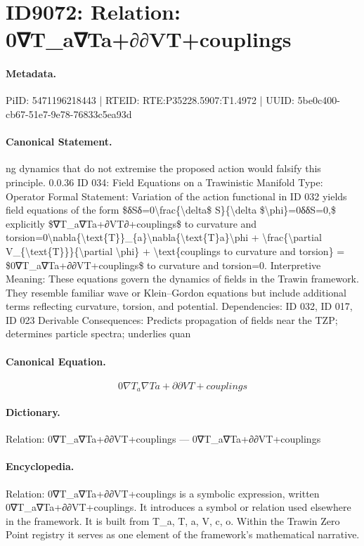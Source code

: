 \section*{ID9072: Relation: 0∇T\_a∇Ta+∂∂VT+couplings}
\paragraph{Metadata.}
PiID: 5471196218443 | RTEID: RTE:P35228.5907:T1.4972 | UUID: 5be0c400-cb67-51e7-9e78-76833c5ea93d

\paragraph{Canonical Statement.}
ng dynamics that do not extremise the proposed action would falsify this principle. 0.0.36 ID 034: Field Equations on a Trawinistic Manifold Type: Operator Formal Statement: Variation of the action functional in ID 032 yields field equations of the form \$δSδ=0\textbackslash{}frac\{\textbackslash{}delta\$ S\}\{\textbackslash{}delta \$\textbackslash{}phi\}=0δδS=0,\$ explicitly \$∇T\_a∇Ta+∂VT∂+couplings\$ to curvature and torsion=0\textbackslash{}nabla\{\textbackslash{}text\{T\}\}\_\{a\}\textbackslash{}nabla\{\textbackslash{}text\{T\}a\}\textbackslash{}phi + \textbackslash{}frac\{\textbackslash{}partial V\_\{\textbackslash{}text\{T\}\}\}\{\textbackslash{}partial \textbackslash{}phi\} + \textbackslash{}text\{couplings to curvature and torsion\} = \$0∇T\_a∇Ta+∂∂VT+couplings\$ to curvature and torsion=0. Interpretive Meaning: These equations govern the dynamics of fields in the Trawin framework. They resemble familiar wave or Klein–Gordon equations but include additional terms reflecting curvature, torsion, and potential. Dependencies: ID 032, ID 017, ID 023 Derivable Consequences: Predicts propagation of fields near the TZP; determines particle spectra; underlies quan

\paragraph{Canonical Equation.}
\[
0∇T_a∇Ta+∂∂VT+couplings
\]

\paragraph{Dictionary.}
Relation: 0∇T\_a∇Ta+∂∂VT+couplings — 0∇T\_a∇Ta+∂∂VT+couplings

\paragraph{Encyclopedia.}
Relation: 0∇T\_a∇Ta+∂∂VT+couplings is a symbolic expression, written 0∇T\_a∇Ta+∂∂VT+couplings. It introduces a symbol or relation used elsewhere in the framework. It is built from T\_a, T, a, V, c, o. Within the Trawin Zero Point registry it serves as one element of the framework's mathematical narrative.

